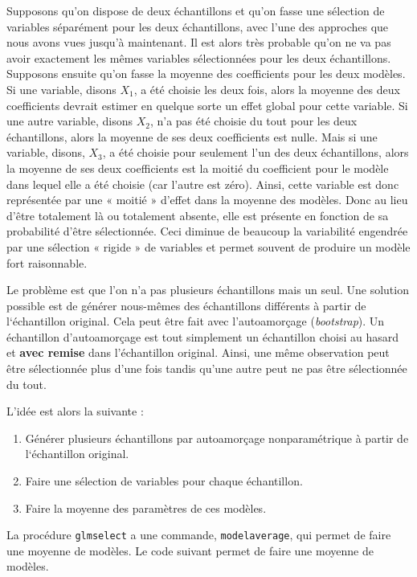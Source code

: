 \documentclass[
  11pt,
  letterpaper,
]{book}
\providecommand{\tightlist}{%
  \setlength{\itemsep}{0pt}\setlength{\parskip}{0pt}}
\theoremstyle{definition}
\theoremstyle{definition}
\theoremstyle{definition}
\theoremstyle{remark}
\begin{document}
Supposons qu'on dispose de deux échantillons et qu'on fasse une sélection de variables séparément pour les deux échantillons, avec l'une des approches que nous avons vues jusqu'à maintenant. Il est alors très probable qu'on ne va pas avoir exactement les mêmes variables sélectionnées pour les deux échantillons. Supposons ensuite qu'on fasse la moyenne des coefficients pour les deux modèles. Si une variable, disons \(X_1\), a été choisie les deux fois, alors la moyenne des deux coefficients devrait estimer en quelque sorte un effet global pour cette variable. Si une autre variable, disons \(X_2\), n'a pas été choisie du tout pour les deux échantillons, alors la moyenne de ses deux coefficients est nulle. Mais si une variable, disons, \(X_3\), a été choisie pour seulement l'un des deux échantillons, alors la moyenne de ses deux coefficients est la moitié du coefficient pour le modèle dans lequel elle a été choisie (car l'autre est zéro). Ainsi, cette variable est donc représentée par une « moitié » d'effet dans la moyenne des modèles. Donc au lieu d'être totalement là ou totalement absente, elle est présente en fonction de sa probabilité d'être sélectionnée. Ceci diminue de beaucoup la variabilité engendrée par une sélection « rigide » de variables et permet souvent de produire un modèle fort raisonnable.

Le problème est que l'on n'a pas plusieurs échantillons mais un seul. Une solution possible est de générer nous-mêmes des échantillons différents à partir de l`échantillon original. Cela peut être fait avec l'autoamorçage (\emph{bootstrap}). Un échantillon d'autoamorçage est tout simplement un échantillon choisi au hasard et \textbf{avec remise} dans l'échantillon original. Ainsi, une même observation peut être sélectionnée plus d'une fois tandis qu'une autre peut ne pas être sélectionnée du tout.

L'idée est alors la suivante :

\begin{enumerate}
\def\labelenumi{\arabic{enumi})}
\tightlist
\item
  Générer plusieurs échantillons par autoamorçage nonparamétrique à partir de l`échantillon original.
\item
  Faire une sélection de variables pour chaque échantillon.
\item
  Faire la moyenne des paramètres de ces modèles.
\end{enumerate}

La procédure \texttt{glmselect} a une commande, \texttt{modelaverage}, qui permet de faire une moyenne de modèles. Le code suivant permet de faire une moyenne de modèles.
\end{document}

